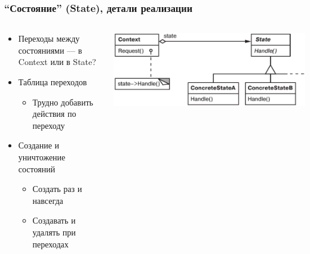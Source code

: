 \documentclass[xetex,mathserif,serif]{beamer}
\begin{document}
	\begin{frame}
		\frametitle{``Состояние'' (State), детали реализации}
		\begin{columns}
			\begin{column}{0.5\textwidth}
				\begin{itemize}
					\item Переходы между состояниями --- в Context или в State?
					\item Таблица переходов
					\begin{itemize}
						\item Трудно добавить действия по переходу
					\end{itemize}
					\item Создание и уничтожение состояний
					\begin{itemize}
						\item Создать раз и навсегда
						\item Создавать и удалять при переходах
					\end{itemize}
				\end{itemize}
			\end{column}
			\begin{column}{0.5\textwidth}
				\begin{center}
					\includegraphics[width=\textwidth]{state.png}
				\end{center}
			\end{column}
		\end{columns}
	\end{frame}
\end{document}
